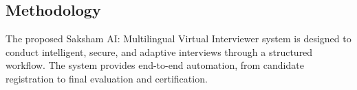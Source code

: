 \documentclass[12pt]{article}
\begin{document}
\onehalfspacing

\vspace{15pt}

\setcounter{section}{4}


\subsection{Methodology}

\vspace{10pt}

\noindent The proposed Saksham AI: Multilingual Virtual Interviewer system is designed to conduct intelligent, secure, and adaptive interviews through a structured workflow. The system provides end-to-end automation, from candidate registration to final evaluation and certification.
\end{document}
